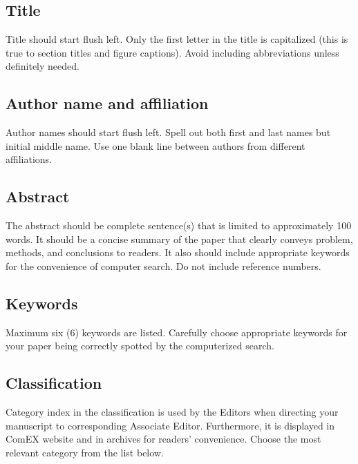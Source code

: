 \documentclass{comex}
\begin{document}
\subsection{Title}

Title should start flush left. Only the first letter in the title is
capitalized (this is true to section titles and figure captions).
Avoid including abbreviations unless definitely needed.

\subsection{Author name and affiliation}

Author names should start flush left. Spell out both first and last
names but initial middle name. Use one blank line between authors from
different affiliations.

\subsection{Abstract}

The abstract should be complete sentence(s) that is limited to
approximately 100 words. It should be a concise summary of the paper
that clearly conveys
problem,
methods, and
conclusions to readers. It also should include appropriate keywords for
the convenience of computer search. Do not include reference numbers.

\subsection{Keywords}

Maximum six (6) keywords are listed. Carefully choose appropriate
keywords for your paper being correctly spotted by the computerized search.

\subsection{Classification}
\label{sec:class}
Category index in the classification is used by the Editors 
when directing your manuscript to corresponding Associate
Editor. Furthermore, it is displayed in ComEX website and in archives for
readers' convenience. Choose the most relevant category from
the list below.
\end{document}
